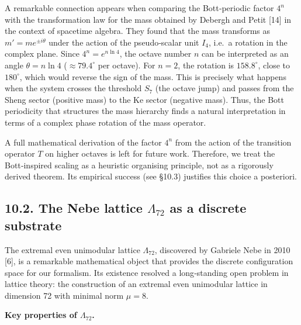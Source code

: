 \documentclass[11pt]{article}
\begin{document}
A remarkable connection appears when comparing the Bott‑periodic factor
\(4^{n}\) with the transformation law for the mass obtained by Debergh
and Petit {[}14{]} in the context of spacetime algebra. They found that
the mass transforms as \(m' = m e^{\pm i\theta}\) under the action of
the pseudo‑scalar unit \(I_4\), i.e.~a rotation in the complex plane.
Since \(4^{n} = e^{n\ln 4}\), the octave number \(n\) can be interpreted
as an angle \(\theta = n\ln 4\) (\(\approx 79.4^\circ\) per octave). For
\(n=2\), the rotation is \(158.8^\circ\), close to \(180^\circ\), which
would reverse the sign of the mass. This is precisely what happens when
the system crosses the threshold \(S_7\) (the octave jump) and passes
from the Sheng sector (positive mass) to the Ke sector (negative mass).
Thus, the Bott periodicity that structures the mass hierarchy finds a
natural interpretation in terms of a complex phase rotation of the mass
operator.

A full mathematical derivation of the factor \(4^n\) from the action of
the transition operator \(T\) on higher octaves is left for future work.
Therefore, we treat the Bott‑inspired scaling as a heuristic organising
principle, not as a rigorously derived theorem. Its empirical success
(see §10.3) justifies this choice a posteriori.

\hypertarget{the-nebe-lattice-lambda_72-as-a-discrete-substrate}{%
\subsection{\texorpdfstring{10.2. The Nebe lattice \(\Lambda_{72}\) as a
discrete
substrate}{10.2. The Nebe lattice \textbackslash Lambda\_\{72\} as a discrete substrate}}\label{the-nebe-lattice-lambda_72-as-a-discrete-substrate}}

The extremal even unimodular lattice \(\Lambda_{72}\), discovered by
Gabriele Nebe in 2010 {[}6{]}, is a remarkable mathematical object that
provides the discrete configuration space for our formalism. Its
existence resolved a long‑standing open problem in lattice theory: the
construction of an extremal even unimodular lattice in dimension 72 with
minimal norm \(\mu = 8\).

\textbf{Key properties of \(\Lambda_{72}\).}
\end{document}
